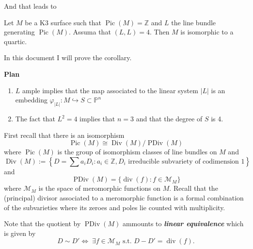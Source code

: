 And that leads to

\begin{coro}\leavevmode
	Let $M$ be a K3 surface such that $\operatorname{Pic}(M) =\mathbb{Z}$ and $L$ the line bundle generating  $\operatorname{Pic}(M)$. Assuma that $(L,L)=4$. Then  $M$ is isomorphic to a quartic.
\end{coro}

In this document I will prove the corollary.

\vspace{1.5em}

\textbf{Plan}
\begin{enumerate}
	\item $L$ ample implies that the map associated to the linear system $|L|$ is an embedding $\varphi_{|L|}:M\hookrightarrow S\subset \mathbb{P}^{n}$

	\item The fact that $L^2=4$ implies that $n=3$ and that the degree of $S$ is 4.
\end{enumerate}

First recall that there is an isomorphism
\[\operatorname{Pic}(M) \cong \operatorname{Div}(M)/\operatorname{PDiv}(M)\]
where $\operatorname{Pic}(M)$ is the group of isomorphism classes of line bundles on $M$ and
\[\operatorname{Div}(M):= \left\{ D=\sum a_iD_i:a_i\in\mathbb{Z}, D_i\text{ irreducible subvariety of codimension 1}  \right\} \]
and
\[\operatorname{PDiv}(M)=\{\operatorname{div}(f):f\in \mathcal{M}_M\}\]
where $\mathcal{M}_M$ is the space of meromorphic functions on $M$. Recall that the (principal) divisor associated to a meromorphic function is a formal combination of the subvarieties where its zeroes and poles lie counted with multiplicity.

Note that the quotient by $\operatorname{PDiv}(M)$ ammounts to \textit{\textbf{linear equivalence}} which is given by
\[D\sim D'\iff\;\exists f\in\mathcal{M}_M\text{ s.t. }D-D'=\operatorname{div}(f).\]

